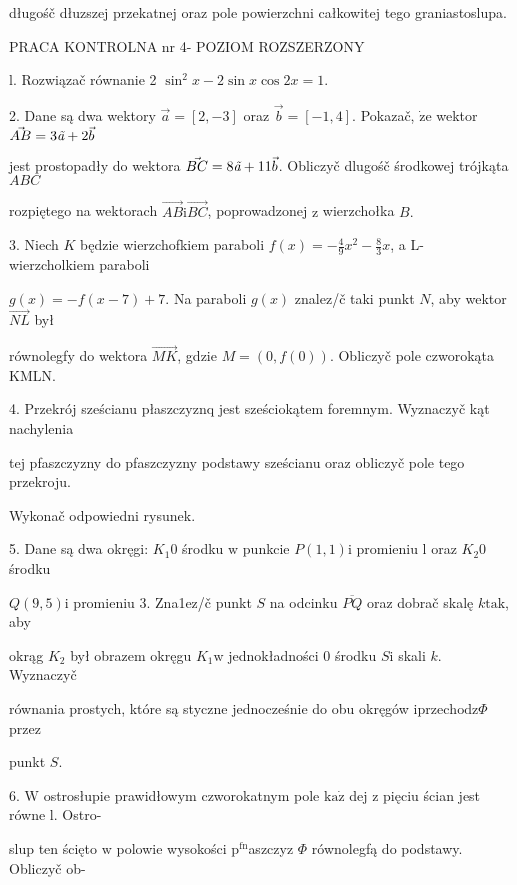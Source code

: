 \documentclass[a4paper,12pt]{article}
\begin{document}
długośč dłuzszej przekatnej oraz pole powierzchni całkowitej tego graniastoslupa.





PRACA KONTROLNA nr 4- POZIOM ROZSZERZONY

l. Rozwiązač równanie 2 $\sin^{2}x-2\sin x\cos 2x=1.$

2. Dane są dwa wektory $\vec{a}= [2,-3]$ oraz $\vec{b}= [-1,4]$. Pokazač, $\dot{\mathrm{z}}\mathrm{e}$ wektor $\vec{AB}=3\text{{\it ã}}+2\vec{b}$

jest prostopadły do wektora $\vec{BC}=8\text{{\it ã}}+11\vec{b}$. Obliczyč dlugośč środkowej trójkąta $ABC$

rozpiętego na wektorach $\vec{AB}\mathrm{i}\vec{BC}$, poprowadzonej $\mathrm{z}$ wierzchołka $B.$

3. Niech $K$ będzie wierzchofkiem paraboli $f(x)=-\displaystyle \frac{4}{9}x^{2}-\frac{8}{3}x$, a L- wierzcholkiem paraboli

$g(x) = -f(x-7)+7$. Na paraboli $g(x)$ znalez/č taki punkt $N$, aby wektor $\vec{NL}$ był

równolegfy do wektora $\vec{MK}$, gdzie $M=(0,f(0))$. Obliczyč pole czworokąta KMLN.

4. Przekrój sześcianu płaszczyznq jest sześciokątem foremnym. Wyznaczyč kąt nachylenia

tej pfaszczyzny do pfaszczyzny podstawy sześcianu oraz obliczyč pole tego przekroju.

Wykonač odpowiedni rysunek.

5. Dane są dwa okręgi: $K_{1} 0$ środku $\mathrm{w}$ punkcie $P(1,1) \mathrm{i}$ promieniu l oraz $K_{2} 0$ środku

$Q(9,5) \mathrm{i}$ promieniu 3. Zna1ez/č punkt $S$ na odcinku $\overline{PQ}$ oraz dobrač skalę $k\mathrm{t}\mathrm{a}\mathrm{k}$, aby

okrąg $K_{2}$ był obrazem okręgu $K_{1} \mathrm{w}$ jednokładności $0$ środku $S\mathrm{i}$ skali $k$. Wyznaczyč

równania prostych, które są styczne jednocześnie do obu okręgów $\mathrm{i}\mathrm{p}\mathrm{r}\mathrm{z}\mathrm{e}\mathrm{c}\mathrm{h}\mathrm{o}\mathrm{d}\mathrm{z}\Phi$ przez

punkt $S.$

6. $\mathrm{W}$ ostrosłupie prawidłowym czworokatnym pole $\mathrm{k}\mathrm{a}\dot{\mathrm{z}}$ dej $\mathrm{z}$ pięciu ścian jest równe l. Ostro-

slup ten ścięto $\mathrm{w}$ polowie wysokości $\mathrm{p}^{\mathrm{f}\mathrm{n}}$aszczyz $\Phi$ równolegfą do podstawy. Obliczyč ob-
\end{document}
